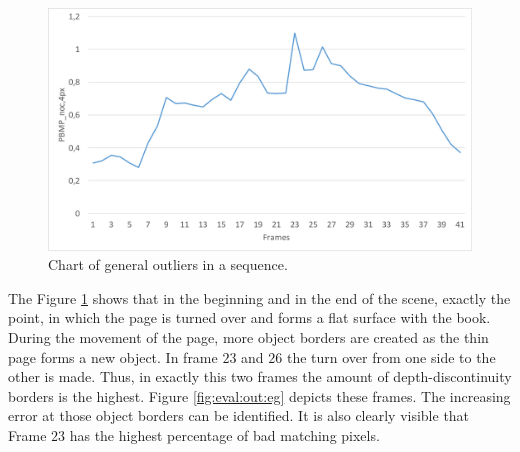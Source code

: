 \begin{figure}[h!]
\centering
\includegraphics[width=1.0\textwidth]{src/images/evaluation/plots/01-book-general-outliers.pdf}
\caption[Chart of general outliers in a sequence]{Chart of general outliers in a sequence.}
\label{fig:eval-plots-outliers}
\end{figure}

\noindent The Figure \ref{fig:eval-plots-outliers} shows that in the beginning and in the end of the scene, exactly the point, in which the page is turned over and forms a flat surface with the book.
During the movement of the page, more object borders are created as the thin page forms a new object.
In frame $23$ and $26$ the turn over from one side to the other is made.
Thus, in exactly this two frames the amount of depth-discontinuity borders is the highest.
Figure \ref{fig:eval:out:eg} depicts these frames.
The increasing error at those object borders can be identified.
It is also clearly visible that Frame $23$ has the highest percentage  of bad matching pixels.

